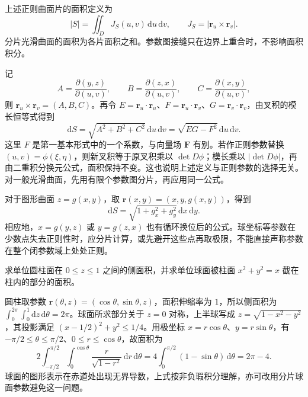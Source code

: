 \documentclass[UTF8,12pt,a4paper,fontset=fandol]{ctexbook}
\begin{document}
\begin{definition}
\label{def:surface-area-parametric}
上述正则曲面片的面积定义为
\begin{equation}
\label{eq:surface-area-parametric}
    |S|=\iint_D J_S(u,v)\,\mathrm du\,\mathrm dv,
    \qquad J_S=|\boldsymbol r_u\times\boldsymbol r_v|.
\end{equation}
分片光滑曲面的面积为各片面积之和。参数图接缝只在边界上重合时，不影响面积积分。
\end{definition}

记
\begin{equation}
\label{eq:surface-normal-minors}
    A=\frac{\partial(y,z)}{\partial(u,v)},\qquad
    B=\frac{\partial(z,x)}{\partial(u,v)},\qquad
    C=\frac{\partial(x,y)}{\partial(u,v)},
\end{equation}
则 $\boldsymbol r_u\times\boldsymbol r_v=(A,B,C)$。再令 $E=\boldsymbol r_u\cdot\boldsymbol r_u$、$F=\boldsymbol r_u\cdot\boldsymbol r_v$、$G=\boldsymbol r_v\cdot\boldsymbol r_v$，由叉积的模长恒等式得到
\begin{equation}
\label{eq:surface-area-element}
    \mathrm dS=\sqrt{A^2+B^2+C^2}\,\mathrm du\,\mathrm dv
    =\sqrt{EG-F^2}\,\mathrm du\,\mathrm dv.
\end{equation}
这里 $F$ 是第一基本形式中的一个系数，与向量场 $\boldsymbol F$ 有别。若作正则参数替换 $(u,v)=\phi(\xi,\eta)$，则新叉积等于原叉积乘以 $\det D\phi$；模长乘以 $|\det D\phi|$，再由二重积分换元公式，面积保持不变。这也说明上述定义与正则参数的选择无关。对一般光滑曲面，先用有限个参数图分片，再应用同一公式。

对于图形曲面 $z=g(x,y)$，取 $\boldsymbol r(x,y)=(x,y,g(x,y))$，得到
\begin{equation}
\label{eq:surface-area-graph}
    \mathrm dS=\sqrt{1+g_x^2+g_y^2}\,\mathrm dx\,\mathrm dy.
\end{equation}
相应地，$x=g(y,z)$ 或 $y=g(z,x)$ 也有循环换位后的公式。球坐标等参数在少数点失去正则性时，应分片计算，或先避开这些点再取极限，不能直接声称参数在整个闭参数域上处处正则。

\begin{example}
\label{ex:surface-area-cylinder-and-sphere}
求单位圆柱面在 $0\leq z\leq1$ 之间的侧面积，并求单位球面被柱面 $x^2+y^2=x$ 截在柱内的部分的面积。
\end{example}
\begin{solve}
圆柱取参数 $\boldsymbol r(\theta,z)=(\cos\theta,\sin\theta,z)$，面积伸缩率为 $1$，所以侧面积为 $\int_0^{2\pi}\int_0^1\mathrm dz\,\mathrm d\theta=2\pi$。球面所求部分关于 $z=0$ 对称，上半球写成 $z=\sqrt{1-x^2-y^2}$，其投影满足 $(x-1/2)^2+y^2\leq1/4$。用极坐标 $x=r\cos\theta$、$y=r\sin\theta$，有 $-\pi/2\leq\theta\leq\pi/2$、$0\leq r\leq\cos\theta$，故面积为
\[
    2\int_{-\pi/2}^{\pi/2}\int_0^{\cos\theta}
    \frac r{\sqrt{1-r^2}}\,\mathrm dr\,\mathrm d\theta
    =4\int_0^{\pi/2}(1-\sin\theta)\,\mathrm d\theta=2\pi-4.
\]
球面的图形表示在赤道处出现无界导数，上式按非负瑕积分理解，亦可改用分片球面参数避免这一问题。
\end{solve}
\end{document}
